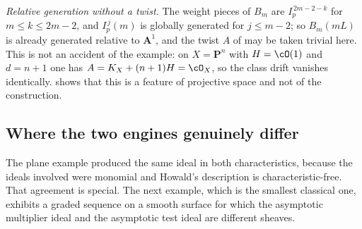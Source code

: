 \begin{example}
\emph{Relative generation without a twist.}  The weight pieces of $B_m$
are $I_p^{\,2m-2-k}$ for $m\le k\le2m-2$, and
$I_p^{\,j}(m)$ is globally generated for $j\le m-2$; so
$B_m(mL)$ is already generated relative to $\mathbf A^1$, and the twist
$A$ of  may be taken trivial here.  This is not an
accident of the example: on $X=\mathbf P^n$ with $H=\cO(1)$ and
$d=n+1$ one has $A=K_X+(n+1)H=\cO_X$, so the class drift vanishes
identically.   shows that this is a feature of
projective space and not of the construction.
\end{example}

\subsection{Where the two engines genuinely differ}
\label{sec:ch40-engines-differ}

The plane example produced the same ideal in both characteristics, because
the ideals involved were monomial and Howald's description is
characteristic-free.  That agreement is special.  The next example, which is
the smallest classical one, exhibits a graded sequence on a smooth surface
for which the asymptotic multiplier ideal and the asymptotic test ideal are
different sheaves.

